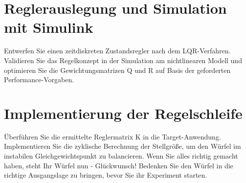     \section{Reglerauslegung und Simulation mit Simulink}
        Entwerfen Sie einen zeitdiskreten Zustandsregler nach dem LQR-Verfahren. Validieren Sie das Regelkonzept in der Simulation am nichtlinearen Modell und optimieren Sie die Gewichtungsmatrizen Q und R auf Basis der geforderten Performance-Vorgaben.

    \section{Implementierung der Regelschleife}
        Überführen Sie die ermittelte Reglermatrix K in die Target-Anwendung. Implementieren Sie die zyklische Berechnung der Stellgröße, um den Würfel im instabilen Gleichgewichtspunkt zu balancieren. Wenn Sie alles richtig gemacht haben, steht Ihr Würfel nun - Glückwunsch! Bedenken Sie den Würfel in die richtige Ausgangslage zu bringen, bevor Sie ihr Experiment starten.
    
